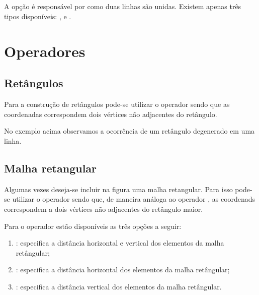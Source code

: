 
\subsection{}
A op\c{c}\~{a}o  \'{e} respons\'{a}vel por como duas linhas s\~{a}o unidas. Existem apenas tr\^{e}s tipos dispon\'{i}veis: ,  e .


\section{Operadores}
\subsection{Ret\^{a}ngulos}
Para a constru\c{c}\~{a}o de ret\^{a}ngulos pode-se utilizar o operador  sendo que as coordenadas correspondem dois v\'{e}rtices n\~{a}o adjacentes do ret\^{a}ngulo.


No exemplo acima observamos a ocorr\^{e}ncia de um ret\^{a}ngulo degenerado em uma linha.

\subsection{Malha retangular}
Algumas vezes deseja-se incluir na figura uma malha retangular. Para isso pode-se utilizar o operador  sendo que, de maneira an\'{a}loga ao operador , as coordenads correspondem a dois v\'{e}rtices n\~{a}o adjacentes do ret\^{a}ngulo maior.


Para o operador  est\~{a}o dispon\'{i}veis as tr\^{e}s op\c{c}\~{o}es a seguir:
\begin{enumerate}
    \item {}: especifica a dist\^{a}ncia horizontal e vertical dos elementos da malha ret\^{a}ngular;
    \item {}: especifica a dist\^{a}ncia horizontal dos elementos da malha ret\^{a}ngular;
    \item {}: especifica a dist\^{a}ncia vertical dos elementos da malha ret\^{a}ngular.
\end{enumerate}

